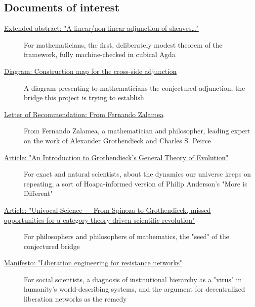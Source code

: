 \documentclass[11pt]{article}
\begin{document}
\subsection{Documents of interest}

\begin{description}

\item[\href{https://codeberg.org/doc2cog/hoapa/src/branch/main/communication/linear_nonlinear_adjunction_abstract.pdf}{Extended abstract: "A linear/non-linear adjunction of sheaves\ldots{}"}]
For mathematicians, the first, deliberately modest theorem of the framework, fully machine-checked in cubical Agda

\item[\href{https://codeberg.org/doc2cog/hoapa/src/branch/main/communication/adjunction_diagram.png}{Diagram: Construction map for the cross-side adjunction}]
A diagram presenting to mathematicians the conjectured adjunction, the bridge this project is trying to establish

\item[\href{https://codeberg.org/doc2cog/hoapa/src/branch/main/communication/reference_zalamea.pdf}{Letter of Recommendation: From Fernando Zalamea}]
From Fernando Zalamea, a mathematician and philosopher, leading expert on the work of Alexander Grothendieck and Charles S. Peirce

\item[\href{https://codeberg.org/doc2cog/hoapa/src/branch/main/communication/general_evolution.pdf}{Article: "An Introduction to Grothendieck's General Theory of Evolution"}]
For exact and natural scientists, about the dynamics our universe keeps on repeating, a sort of Hoapa-informed version of Philip Anderson's "More is Different"

\item[\href{https://codeberg.org/doc2cog/hoapa/src/branch/main/communication/univocal_science.pdf}{Article: "Univocal Science --- From Spinoza to Grothendieck, missed opportunities for a category-theory-driven scientific revolution"}]
For philosophers and philosophers of mathematics, the "seed" of the conjectured bridge

\item[\href{https://codeberg.org/doc2cog/hoapa/src/branch/main/communication/liberation_engineering.pdf}{Manifesto: "Liberation engineering for resistance networks"}]
For social scientists, a diagnosis of institutional hierarchy as a "virus" in humanity's world-describing systems, and the argument for decentralized liberation networks as the remedy

\end{description}
\end{document}
